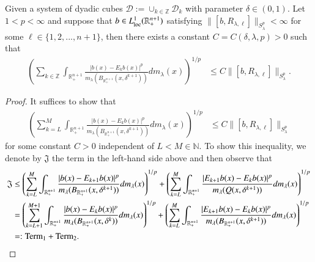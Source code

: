 \documentclass[12pt]{amsart}
\begin{document}
\begin{lemma}\label{step2}
Given a
system of dyadic cubes $\mathcal{D}
    := \cup_{k\in\mathbb{Z}}\mathcal{D}_{k}$ with parameter $\delta\in(0,1)$. Let $1<p<\infty$ and suppose that $b\in L_{{\rm loc}}^1(\mathbb{R}_{+}^{n+1})$  satisfying $\|[b,R_{\lambda,\ell}]\|_{S_\lambda^p}<\infty$ for some $\ell\in\{1,2,...,n+1\}$, then  there exists a constant $C=C(\delta,\lambda,p)>0$ such that
\begin{align}\label{eee Besov type}
\left(\sum_{k\in\mathbb{Z}}\int_{\mathbb{R}_{+}^{n+1}}\frac{|b(x)-E_{k}b(x)|^{p}}{m_\lambda(B_{\mathbb{R}_+^{n+1}}(x,\delta^{k+1}))}dm_\lambda(x)\right)^{1/p}&\leq C  \|[b,R_{\lambda,\ell}]\|_{S_\lambda^{p}}.
\end{align}
\end{lemma}
\begin{proof}
It suffices to show that
\begin{align}
\left(\sum_{k=L}^M\int_{\mathbb{R}_{+}^{n+1}}\frac{|b(x)-E_{k}b(x)|^{p}}{m_\lambda(B_{\mathbb{R}_+^{n+1}}(x,\delta^{k+1}))}dm_\lambda(x)\right)^{1/p}&\leq C  \|[b,R_{\lambda,\ell}]\|_{S_\lambda^{p}}
\end{align}
for some constant $C>0$ independent of $L<M\in\mathbb{N}$. To show this inequality, we denote by $\mathfrak J$ the term in the left-hand side above and then observe that
\begin{align*}
\mathfrak J&\leq \left(\sum_{k=L}^M\int_{\mathbb{R}_{+}^{n+1}}\frac{|b(x)-E_{k+1}b(x)|^{p}}{m_\lambda(B_{\mathbb{R}_+^{n+1}}(x,\delta^{k+1}))}dm_\lambda(x)\right)^{1/p}+\left(\sum_{k=L}^M\int_{\mathbb{R}_{+}^{n+1}}\frac{|E_{k+1}b(x)-E_{k}b(x)|^{p}}{m_\lambda(Q(x,\delta^{k+1}))}dm_\lambda(x)\right)^{1/p}\\
&=\left(\sum_{k=L+1}^{M+1}\int_{\mathbb{R}_{+}^{n+1}}\frac{|b(x)-E_{k}b(x)|^{p}}{m_\lambda(B_{\mathbb{R}_+^{n+1}}(x,\delta^{k}))}dm_\lambda(x)\right)^{1/p}+\left(\sum_{k=L}^M \int_{\mathbb{R}_{+}^{n+1}}\frac{|E_{k+1}b(x)-E_{k}b(x)|^{p}}{m_\lambda(B_{\mathbb{R}_+^{n+1}}(x,\delta^{k+1}))}dm_\lambda(x)\right)^{1/p}\\
&=: {\textup{Term}_{1}}+{\textup{Term}_{2}}. %

\end{align*}
\end{proof}
\end{document}
